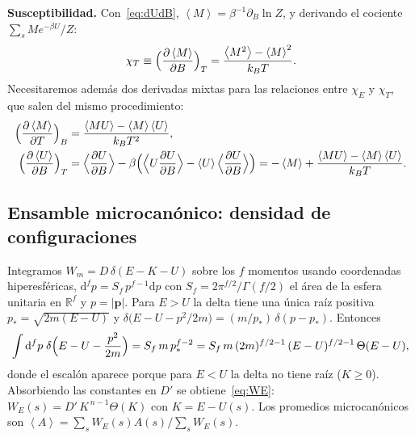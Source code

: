 \documentclass[11pt,letterpaper]{article}
\newcommand{\avg}[1]{\left\langle #1 \right\rangle}
\newcommand{\kB}{k_{B}}
\newcommand{\dd}{\mathrm{d}}
\begin{document}
\vspace{0.5cm}
\noindent
\textbf{Susceptibilidad.} Con~\eqref{eq:dUdB}, $\avg M=\beta^{-1}\partial_B\ln Z$, y
derivando el cociente $\sum_sMe^{-\beta U}/Z$:
\begin{equation}
\chi_T\equiv\Bigl(\frac{\partial\avg M}{\partial B}\Bigr)_T=\frac{\avg{M^2}-\avg M^2}{\kB T}.
\label{eq:chiT}
\end{equation}
Necesitaremos además dos derivadas mixtas para las relaciones entre $\chi_E$ y $\chi_T$, que salen del mismo procedimiento:
\begin{align}
\Bigl(\frac{\partial\avg M}{\partial T}\Bigr)_B&=\frac{\avg{MU}-\avg M\avg U}{\kB T^2},
\label{eq:dMdT}\\
\Bigl(\frac{\partial\avg U}{\partial B}\Bigr)_T&=\Bigl\langle\frac{\partial U}{\partial B}\Bigr\rangle
-\beta\Bigl(\Bigl\langle U\frac{\partial U}{\partial B}\Bigr\rangle-\avg U\Bigl\langle\frac{\partial U}{\partial B}\Bigr\rangle\Bigr)
=-\avg M+\frac{\avg{MU}-\avg M\avg U}{\kB T}.
\label{eq:dUdB-T}
\end{align}

\subsection{Ensamble microcanónico: densidad de configuraciones}
Integramos $W_m=D\,\delta(E-K-U)$ sobre los $f$ momentos usando coordenadas
hiperesféricas, $\dd^fp=S_f\,p^{f-1}\dd p$ con $S_f=2\pi^{f/2}/\Gamma(f/2)$ el área de
la esfera unitaria en $\mathbb R^f$ y $p=|\bm p|$. Para $E>U$ la delta tiene una
única raíz positiva $p_*=\sqrt{2m(E-U)}$ y
$\delta\bigl(E-U-p^2/2m\bigr)=(m/p_*)\,\delta(p-p_*)$. Entonces
\begin{equation}
\int\dd^fp\;\delta\Bigl(E-U-\frac{p^2}{2m}\Bigr)=S_f\,m\,p_*^{f-2}
=S_f\,m\,(2m)^{f/2-1}\,(E-U)^{f/2-1}\,\Theta(E-U),
\end{equation}
donde el escalón aparece porque para $E<U$ la delta no tiene raíz ($K\ge0$). Absorbiendo
las constantes en $D'$ se obtiene~\eqref{eq:WE}:
$W_E(s)=D'\,K^{\,n-1}\Theta(K)$ con $K=E-U(s)$. Los promedios microcanónicos son
$\avg A=\sum_sW_E(s)A(s)/\sum_sW_E(s)$.
\end{document}
